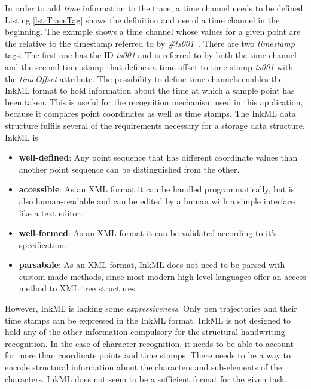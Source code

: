 In order to add \emph{time} information to the trace,
a time channel needs to be defined. Listing \ref{lst:TraceTag} shows the 
definition and use of a time channel in the beginning. 
The example shows a time channel whose values for a given point are the 
relative to the timestamp referred to by 
\emph{\#ts001}~. There are two \emph{timestamp} tags.
The first one has the ID \emph{ts001} and is referred to by both the
time channel and the second time stamp that defines a time offset to time stamp
\emph{ts001} with the \emph{timeOffset} attribute.
The possibility to define time channels enables the InkML format to hold 
information about the time at which a sample point has been taken.
This is useful for the recognition mechanism used in this application,
because it compares point coordinates as well as time stamps.
The InkML data structure fulfils several of the requirements necessary for a 
storage data structure. InkML is 
\begin{itemize}
  \item \textbf{well-defined}: Any point sequence that has different coordinate
        values than another point sequence can be distinguished from the other.
        
  \item \textbf{accessible}: As an XML format it can be handled programmatically,
        but is also human-readable and can be edited by a human with a simple
        interface like a text editor.

  \item \textbf{well-formed}: As an XML format it can be validated according to 
        it's specification.

  \item \textbf{parsabale}: As an XML format, InkML does not need to be parsed 
        with custom-made methods, since most modern high-level languages offer
        an access method to XML tree structures.
\end{itemize}
However, InkML is lacking some \emph{expressiveness}. Only pen trajectories and
their time stamps can be expressed in the InkML format. InkML is not designed 
to hold any of the other information compulsory for the structural handwriting
recognition. In the case of character recognition, it needs to be able to 
account for more than coordinate points and time stamps. There needs to be a 
way to encode structural information about the characters and sub-elements of 
the characters. InkML does not seem to be a sufficient format for the given task.

